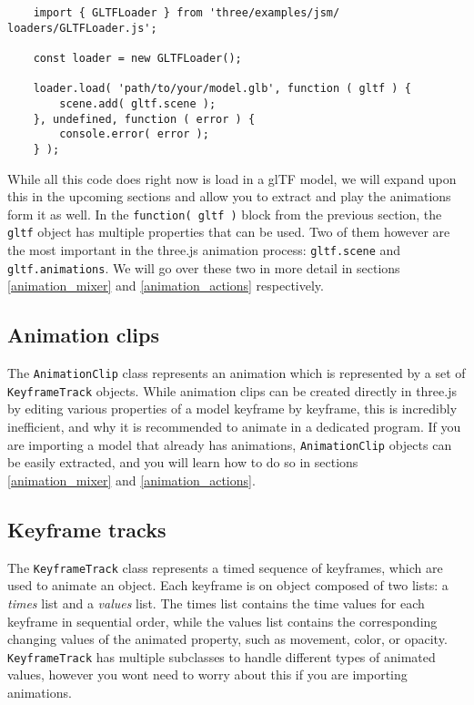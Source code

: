 \documentclass[10pt,final,journal,compsoc]{IEEEtran}
\begin{document}
    \begin{lstlisting}
    import { GLTFLoader } from 'three/examples/jsm/ loaders/GLTFLoader.js';

    const loader = new GLTFLoader();
    
    loader.load( 'path/to/your/model.glb', function ( gltf ) {
		scene.add( gltf.scene );
    }, undefined, function ( error ) {
        console.error( error );
    } );
    \end{lstlisting}
    
    While all this code does right now is load in a glTF model, we will expand upon this in the upcoming sections and allow you to extract and play the animations form it as well.
    In the \verb|function( gltf )| block from the previous section, the \verb|gltf| object has multiple properties that can be used. Two of them however are the most important in the three.js animation process: \verb|gltf.scene| and \verb|gltf.animations|. We will go over these two in more detail in sections \ref{animation_mixer} and \ref{animation_actions} respectively.
    
    \subsection{Animation clips} \label{animation_clips}
    The \verb|AnimationClip| class represents an animation which is represented by a set of \verb|KeyframeTrack| objects. While animation clips can be created directly in three.js by editing various properties of a model keyframe by keyframe, this is incredibly inefficient, and why it is recommended to animate in a dedicated program. If you are importing a model that already has animations, \verb|AnimationClip| objects can be easily extracted, and you will learn how to do so in sections \ref{animation_mixer} and \ref{animation_actions}.
    
    \subsection{Keyframe tracks} \label{keyframes}
    The \verb|KeyframeTrack| class represents a timed sequence of keyframes, which are used to animate an object. Each keyframe is on object composed of two lists: a \textit{times} list and a \textit{values} list. The times list contains the time values for each keyframe in sequential order, while the values list contains the corresponding changing values of the animated property, such as movement, color, or opacity. \verb|KeyframeTrack| has multiple subclasses to handle different types of animated values, however you wont need to worry about this if you are importing animations.
    
\end{document}
